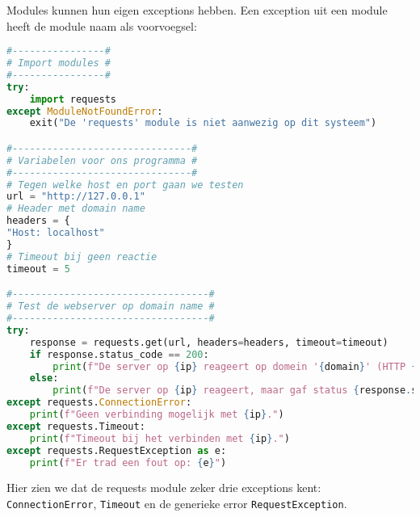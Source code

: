 Modules kunnen hun eigen exceptions hebben. Een exception uit een module heeft de module naam als voorvoegsel:
\begin{lstlisting}[language=python]
#----------------#
# Import modules #
#----------------#
try:
    import requests
except ModuleNotFoundError:
    exit("De 'requests' module is niet aanwezig op dit systeem")

#-------------------------------#
# Variabelen voor ons programma #
#-------------------------------#
# Tegen welke host en port gaan we testen
url = "http://127.0.0.1"
# Header met domain name
headers = {
"Host: localhost"
}
# Timeout bij geen reactie
timeout = 5

#----------------------------------#
# Test de webserver op domain name #
#----------------------------------#
try:
    response = requests.get(url, headers=headers, timeout=timeout)
    if response.status_code == 200:
        print(f"De server op {ip} reageert op domein '{domain}' (HTTP {response.status_code}).")
    else:
        print(f"De server op {ip} reageert, maar gaf status {response.status_code} voor domein '{domain}'.")
except requests.ConnectionError:
    print(f"Geen verbinding mogelijk met {ip}.")
except requests.Timeout:
    print(f"Timeout bij het verbinden met {ip}.")
except requests.RequestException as e:
    print(f"Er trad een fout op: {e}")
\end{lstlisting}
Hier zien we dat de requests module zeker drie exceptions kent: \texttt{ConnectionError}, \texttt{Timeout} en de generieke error \texttt{RequestException}.
